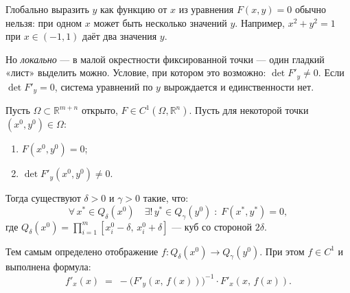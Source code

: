 \begin{note}[Мотивация]
  Глобально выразить $y$ как функцию от $x$ из уравнения $F(x,y) = 0$
  обычно нельзя: при одном $x$ может быть несколько значений $y$.
  Например, $x^2 + y^2 = 1$ при $x \in (-1,1)$ даёт два значения $y$.

  Но \emph{локально} --- в малой окрестности фиксированной точки ---
  один гладкий «лист» выделить можно. Условие, при котором это возможно:
  $\det F'_y \neq 0$. Если $\det F'_y = 0$, система уравнений по $y$
  вырождается и единственности нет.
\end{note}


\begin{theorem}
  \label{theorem:implicit}
  Пусть $\Omega \subset \mathbb{R}^{m+n}$ открыто, $F \in C^1(\Omega, \mathbb{R}^n)$.
  Пусть для некоторой точки $(x^0, y^0) \in \Omega$:
  \begin{enumerate}
    \item $F(x^0, y^0) = 0$;
    \item $\det F'_y(x^0, y^0) \neq 0$.
  \end{enumerate}
  Тогда существуют $\delta > 0$ и $\gamma > 0$ такие, что:
  \[
    \forall\, x^* \in Q_\delta(x^0)\quad
    \exists!\, y^* \in Q_\gamma(y^0) \;:\;
    F(x^*, y^*) = 0,
  \]
  где $Q_\delta(x^0) = \prod_{i=1}^m [x^0_i - \delta,\, x^0_i + \delta]$ ---
  куб со стороной $2\delta$.

  \medskip
  Тем самым определено отображение $f : Q_\delta(x^0) \to Q_\gamma(y^0)$.
  При этом $f \in C^1$ и выполнена формула:
  \[
    f'_x(x) \;=\;
    -\bigl(F'_y(x,\, f(x))\bigr)^{-1} \cdot F'_x(x,\, f(x)).
  \]
\end{theorem}


